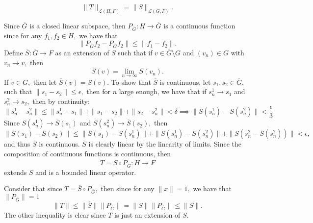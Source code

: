 \documentclass[11pt]{article}
\newcommand{\sm}{\setminus}
\begin{document}
\begin{problem}
\begin{problem}
\[
\|T\|_{\mathcal{L}(H,F)} = \|S\|_{\mathcal{L}(G,F)}.\]
\end{problem}
\begin{solution}
    Since $\overline{G}$ is a closed linear subspace, then $P_{\overline{G}}: H \to \overline{G}$ is a continuous function since for any $f_1, f_2 \in H,$ we have that 
    \[\|P_{\overline{G}}f_2 - P_{\overline{G}}f_2\|\leq \|f_1 - f_2\|.\] Define $\overline{S}: \overline{G}\to F$ as an extension of $S$ such that if $v\in \overline{G}\sm G$ and $(v_n)\in G$ with $v_n \to v,$ then 
    \[\overline{S}(v) = \lim_{n\to \infty} S(v_n).\] If $v\in G,$ then let $\overline{S}(v) = S(v).$ To show that $\overline{S}$ is continuous, let $s_1, s_2 \in \overline{G},$ such that $\|s_1 - s_2\|\leq \epsilon,$ then for $n$ large enough, we have that if $s_n^1 \to s_1$ and $s_n^2 \to s_2,$ then by continuity:
    \[\|s_n^1 - s_n^2\|\leq \|s_n^1 - s_1\| + \|s_1 - s_2\| + \|s_2  - s_n^2\|< \delta \implies \|S(s_n^1) - S(s_n^2)\|< \frac{\epsilon}{3}\]
    Since $S(s_n^1) \to \overline{S}(s_1)$ and $S(s_n^2) \to \overline{S}(s_2),$ then 
    \[\|\overline{S}(s_1) - \overline{S}(s_2)\|\leq \|\overline{S}(s_1) - S(s_n^1)\| + \|S(s_n^1) - S(s_n^2)\| + \|S(s_n^2 - \overline{S}(s_n^2))\|< \epsilon,\] and thus $\overline{S}$ is continuous. $\overline{S}$ is clearly linear by the linearity of limits. Since the composition of continuous functions is continuous, then 
    \[T = \overline{S}\circ P_{\overline{G}}: H \to F \] extends $S$ and is a bounded linear operator. 

    Consider that since $T = \overline{S}\circ P_{\overline{G}},$ then since for any $\|x\| = 1,$ we have that $\|P_{\overline{G}}\| = 1$
    \[\|T\| \leq \|\overline{S}\|\|P_{\overline{G}}\| = \|S\|\|P_{\overline{G}}\| \leq \|S\|.\] The other inequality is clear since $T$ is just an extension of $S.$
\end{solution}

\end{problem}
\newpage
\end{document}
